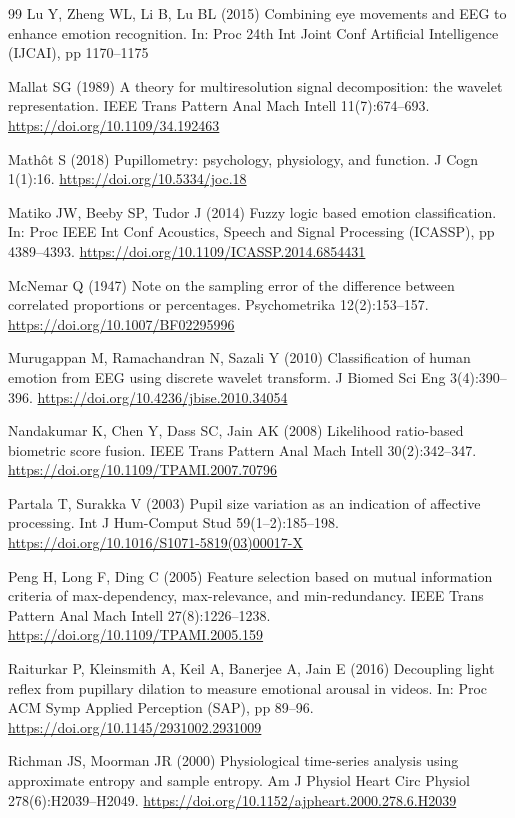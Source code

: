 \begin{thebibliography}{99}
 Lu Y, Zheng WL, Li B, Lu BL (2015) Combining eye movements and EEG to enhance emotion recognition. In: Proc 24th Int Joint Conf Artificial Intelligence (IJCAI), pp 1170--1175

 Mallat SG (1989) A theory for multiresolution signal decomposition: the wavelet representation. IEEE Trans Pattern Anal Mach Intell 11(7):674--693. \url{https://doi.org/10.1109/34.192463}

 Math\^ot S (2018) Pupillometry: psychology, physiology, and function. J Cogn 1(1):16. \url{https://doi.org/10.5334/joc.18}

 Matiko JW, Beeby SP, Tudor J (2014) Fuzzy logic based emotion classification. In: Proc IEEE Int Conf Acoustics, Speech and Signal Processing (ICASSP), pp 4389--4393. \url{https://doi.org/10.1109/ICASSP.2014.6854431}

 McNemar Q (1947) Note on the sampling error of the difference between correlated proportions or percentages. Psychometrika 12(2):153--157. \url{https://doi.org/10.1007/BF02295996}

 Murugappan M, Ramachandran N, Sazali Y (2010) Classification of human emotion from EEG using discrete wavelet transform. J Biomed Sci Eng 3(4):390--396. \url{https://doi.org/10.4236/jbise.2010.34054}

 Nandakumar K, Chen Y, Dass SC, Jain AK (2008) Likelihood ratio-based biometric score fusion. IEEE Trans Pattern Anal Mach Intell 30(2):342--347. \url{https://doi.org/10.1109/TPAMI.2007.70796}

 Partala T, Surakka V (2003) Pupil size variation as an indication of affective processing. Int J Hum-Comput Stud 59(1--2):185--198. \url{https://doi.org/10.1016/S1071-5819(03)00017-X}

 Peng H, Long F, Ding C (2005) Feature selection based on mutual information criteria of max-dependency, max-relevance, and min-redundancy. IEEE Trans Pattern Anal Mach Intell 27(8):1226--1238. \url{https://doi.org/10.1109/TPAMI.2005.159}

 Raiturkar P, Kleinsmith A, Keil A, Banerjee A, Jain E (2016) Decoupling light reflex from pupillary dilation to measure emotional arousal in videos. In: Proc ACM Symp Applied Perception (SAP), pp 89--96. \url{https://doi.org/10.1145/2931002.2931009}

 Richman JS, Moorman JR (2000) Physiological time-series analysis using approximate entropy and sample entropy. Am J Physiol Heart Circ Physiol 278(6):H2039--H2049. \url{https://doi.org/10.1152/ajpheart.2000.278.6.H2039}


\end{thebibliography}
